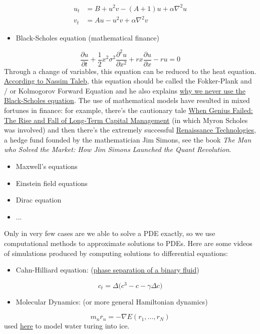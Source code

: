 \documentclass[12pt,a4paper]{article}
\begin{document}
\begin{align*}
u_t &= B + u^2 v - (A+1) u + \alpha \nabla^2 u \\ 
v_t &= Au  - u^2 v + \alpha \nabla^2 v
\end{align*}
\begin{itemize}
\item Black-Scholes equation (mathematical finance)

\end{itemize}
\[
\frac{\partial u}{\partial t} + \frac{1}{2}x^2\sigma^2 \frac{\partial^2 u}{\partial x^2} + rx \frac{\partial u}{\partial x} - ru = 0
\]
Through a change of variables, this equation can be reduced to the heat equation. \href{https://twitter.com/nntaleb/status/1596178404675551239}{According to Nassim Taleb}, this equation should be called the Fokker-Plank and / or Kolmogorov Forward Equation and he also explains \href{https://www.youtube.com/watch?v=UoGlUZPNouM}{why we never use the Black-Scholes equation}.   The use of mathematical models have resulted in mixed fortunes in finance: for example, there's the cautionary tale \href{https://en.wikipedia.org/wiki/When_Genius_Failed}{When Genius Failed: The Rise and Fall of Long-Term Capital Management} (in which Myron Scholes was involved) and then there's the extremely successful \href{https://en.wikipedia.org/wiki/Renaissance_Technologies}{Renaissance Technologies}, a hedge fund founded by the mathematician Jim Simons, see the book \emph{The Man who Solved the Market: How Jim Simons Launched the Quant Revolution}. 

\begin{itemize}
\item Maxwell's equations 


\item Einstein field equations


\item Dirac equation


\item ...

\end{itemize}
Only in very few cases are we able to solve a PDE exactly, so we use computational methods to approximate solutions to PDEs. Here are some videos of simulations produced by computing solutions to differential equations:

\begin{itemize}
\item Cahn-Hilliard equation: (\href{https://www.youtube.com/watch?v=MovUu2DwWvI}{phase separation of a binary fluid})

\end{itemize}
\[
c_t = \Delta \big( c^3 - c - \gamma \Delta c \big)
\]
\begin{itemize}
\item Molecular Dynamics: (or more general Hamiltonian dynamics)

\end{itemize}
\[
m_n \ddot{r_n} = - \nabla E(r_1, \dots, r_N)
\]
used \href{https://www.youtube.com/watch?v=zRUFzJrDtq0}{here} to model water turing into ice.
\end{document}
